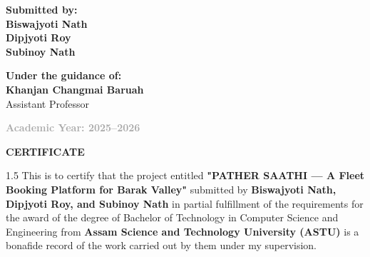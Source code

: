 \begin{titlepage}
    \begin{minipage}[t]{0.45\textwidth}
        \begin{flushleft}
            \textbf{\textcolor{brandteal}{Submitted by:}}\\
            \vspace{0.2cm}
            \textbf{Biswajyoti Nath}\\
            \textbf{Dipjyoti Roy}\\
            \textbf{Subinoy Nath}\\
        \end{flushleft}
    \end{minipage}
    \hfill
    \begin{minipage}[t]{0.45\textwidth}
        \begin{flushright}
            \textbf{\textcolor{brandteal}{Under the guidance of:}}\\
            \vspace{0.2cm}
            \textbf{Khanjan Changmai Baruah}\\
            \relax Assistant Professor\\
        \end{flushright}
    \end{minipage}
    
    \vspace{1.5cm}
    \begin{center}
        \textbf{\textcolor{darkgray}{Academic Year: 2025--2026}}
    \end{center}
    \vspace*{1cm}
\end{titlepage}

\newpage
\thispagestyle{empty}
\begin{center}
    {\Huge \textbf{CERTIFICATE}}\par
    \vspace{1.5cm}
\end{center}

\begin{spacing}{1.5}
This is to certify that the project entitled \textbf{"PATHER SAATHI --- A Fleet Booking Platform for Barak Valley"} submitted by \textbf{Biswajyoti Nath, Dipjyoti Roy, and Subinoy Nath} in partial fulfillment of the requirements for the award of the degree of Bachelor of Technology in Computer Science and Engineering from \textbf{Assam Science and Technology University (ASTU)} is a bonafide record of the work carried out by them under my supervision.
\end{spacing}

